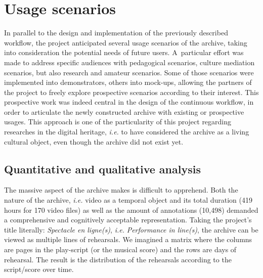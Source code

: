 \documentclass[conference]{IEEEtran}
\newcommand{\todo}[1]{\noindent\textcolor{red}{{\bf \{ToDo} #1{\bf \}}}}
\begin{document}
\section{Usage scenarios}
\label{sec:scenarios}
In parallel to the design and implementation of the previously described workflow, the project anticipated several usage scenarios of the archive, taking into consideration the potential needs of future users. A~particular effort was made to address specific audiences with pedagogical scenarios, culture mediation scenarios, but also research and amateur scenarios. Some of those scenarios were implemented into demonstrators, others into mock-ups, allowing the partners of the project to freely explore prospective scenarios according to their interest. This prospective work was indeed central in the design of the continuous workflow, in order to articulate the newly constructed archive with existing or prospective usages. This approach is one of the particularity of this project regarding researches in the digital heritage, {\it i.e.} to have considered the archive as a living cultural object, even though the archive did not exist yet.

\subsection{Quantitative and qualitative analysis}
The massive aspect of the archive makes is difficult to apprehend. Both the nature of the archive, {\it i.e.} video as a temporal object\cite{stiegler98}  and its total duration (419 hours for 170 video files) as well as the amount of annotations (10,498) demanded a comprehensive and cognitively acceptable representation. Taking the project's title literally: \emph{Spectacle en ligne(s)}, {\it i.e.} \emph{Performance in line(s)}, the archive can be viewed as multiple lines of rehearsals. We imagined a matrix where the columns are pages in the play-script  (or the musical score) and the rows are days of rehearsal. The result is the distribution of the rehearsals according to the script/score over time.

\end{document}
